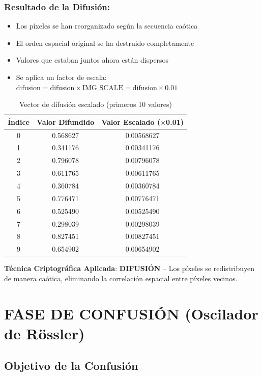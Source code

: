 \documentclass[12pt,a4paper]{article}
\begin{document}
\subsubsection*{Resultado de la Difusión:}
\begin{itemize}
    \item Los píxeles se han reorganizado según la secuencia caótica
    \item El orden espacial original se ha destruido completamente
    \item Valores que estaban juntos ahora están dispersos
    \item Se aplica un factor de escala: $\text{difusion} = \text{difusion} \times \text{IMG\_SCALE} = \text{difusion} \times 0.01$
\end{itemize}

\begin{table}[H]
\centering
\caption{Vector de difusión escalado (primeros 10 valores)}
\label{tab:scaled_diffusion}
\begin{tabular}{@{}ccc@{}}
\toprule
\textbf{Índice} & \textbf{Valor Difundido} & \textbf{Valor Escalado ($\times$0.01)} \\ \midrule
0 & 0.568627 & 0.00568627 \\
1 & 0.341176 & 0.00341176 \\
2 & 0.796078 & 0.00796078 \\
3 & 0.611765 & 0.00611765 \\
4 & 0.360784 & 0.00360784 \\
5 & 0.776471 & 0.00776471 \\
6 & 0.525490 & 0.00525490 \\
7 & 0.298039 & 0.00298039 \\
8 & 0.827451 & 0.00827451 \\
9 & 0.654902 & 0.00654902 \\ \bottomrule
\end{tabular}
\end{table}

\textbf{Técnica Criptográfica Aplicada}: \textbf{DIFUSIÓN} -- Los píxeles se redistribuyen de manera caótica, eliminando la correlación espacial entre píxeles vecinos.

\section{FASE DE CONFUSIÓN (Oscilador de Rössler)}

\subsection{Objetivo de la Confusión}
\end{document}
